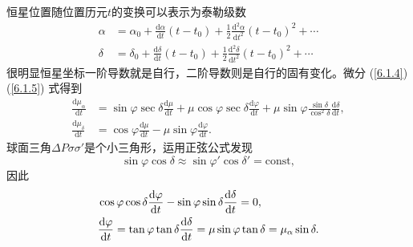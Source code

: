 \documentclass[11pt, a4paper, oneside]{ctexart}
\numberwithin{equation}{subsection}
\begin{document}
恒星位置随位置历元$t$的变换可以表示为泰勒级数
\begin{align}
\alpha&=\alpha_0+\frac{\mathrm{d}\alpha}{\mathrm{d}t}\left(t-t_0\right)+\frac12\frac{\mathrm{d}^2\alpha}{\mathrm{d}t^2}\left(t-t_0\right)^2+\cdots\\
\delta&=\delta_0+\frac{\mathrm{d}\delta}{\mathrm{d}t}\left(t-t_0\right)+\frac12\frac{\mathrm{d}^2\delta}{\mathrm{d}t^2}\left(t-t_0\right)^2+\cdots
\end{align}
很明显恒星坐标一阶导数就是自行，二阶导数则是自行的固有变化。微分 (\ref{6.1.4})(\ref{6.1.5}) 式得到
\begin{align}
\frac{\mathrm{d}\mu_\alpha}{\mathrm{d}t}&=\sin\varphi\sec\delta\frac{\mathrm{d}\mu}{\mathrm{d}t}+\mu\cos\varphi\sec\delta\frac{\mathrm{d}\varphi}{\mathrm{d}t}+\mu\sin\varphi\frac{\sin\delta}{\cos^2\delta}\frac{\mathrm{d}\delta}{\mathrm{d}t},\label{6.1.12}\\
\frac{\mathrm{d}\mu_\delta}{\mathrm{d}t}&=\cos\varphi\frac{\mathrm{d}\mu}{\mathrm{d}t}-\mu\sin\varphi\frac{\mathrm{d}\varphi}{\mathrm{d}t}.\label{6.1.13}
\end{align}
球面三角$\Delta{}P\sigma\sigma'$是个小三角形，运用正弦公式发现
\begin{equation}
\sin\varphi\cos\delta{}\approx\sin\varphi'\cos\delta{}'=\text{const},
\end{equation}
因此
\begin{align}
&\cos\varphi\cos\delta\frac{\mathrm{d}\varphi}{\mathrm{d}t}-\sin\varphi\sin\delta\frac{\mathrm{d}\delta}{\mathrm{d}t}=0,\notag\\
&\frac{\mathrm{d}\varphi}{\mathrm{d}t}=\tan\varphi\tan\delta\frac{\mathrm{d}\delta}{\mathrm{d}t}=\mu\sin\varphi\tan\delta=\mu_\alpha\sin\delta.
\end{align}
\end{document}
